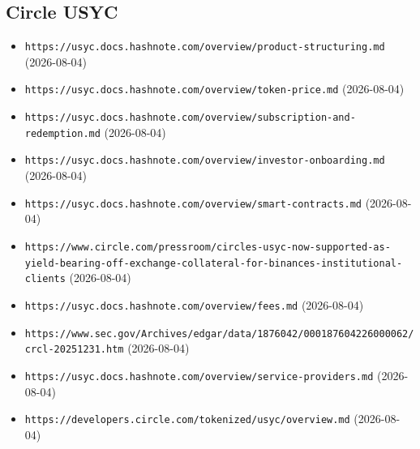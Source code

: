 \subsection*{Circle USYC}
\begin{itemize}\setlength{\itemsep}{0pt}\small
\item \texttt{https://usyc.docs.hashnote.com/overview/product-structuring.md} (2026-08-04)
\item \texttt{https://usyc.docs.hashnote.com/overview/token-price.md} (2026-08-04)
\item \texttt{https://usyc.docs.hashnote.com/overview/subscription-and-redemption.md} (2026-08-04)
\item \texttt{https://usyc.docs.hashnote.com/overview/investor-onboarding.md} (2026-08-04)
\item \texttt{https://usyc.docs.hashnote.com/overview/smart-contracts.md} (2026-08-04)
\item \texttt{https://www.circle.com/pressroom/circles-usyc-now-supported-as-yield-bearing-off-exchange-collateral-for-binances-institutional-clients} (2026-08-04)
\item \texttt{https://usyc.docs.hashnote.com/overview/fees.md} (2026-08-04)
\item \texttt{https://www.sec.gov/Archives/edgar/data/1876042/000187604226000062/crcl-20251231.htm} (2026-08-04)
\item \texttt{https://usyc.docs.hashnote.com/overview/service-providers.md} (2026-08-04)
\item \texttt{https://developers.circle.com/tokenized/usyc/overview.md} (2026-08-04)
\end{itemize}


